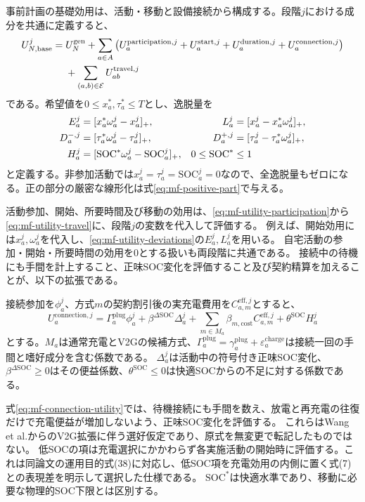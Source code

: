 事前計画の基礎効用は、活動・移動と設備接続から構成する。段階$j$における成分を共通に定義すると、
\begin{align}
 U_{N,\mathrm{base}}^j
 ={}&U_N^{\mathrm{gen}}
 +\sum_{a\in A}\left(
 U_a^{\mathrm{participation},j}+U_a^{\mathrm{start},j}
 +U_a^{\mathrm{duration},j}+U_a^{\mathrm{connection},j}\right)\notag\\
 &+\sum_{(a,b)\in\mathcal E}U_{ab}^{\mathrm{travel},j}
 \label{eq:mf-base-utility}
\end{align}
である。希望値を$0\le x_a^*,\tau_a^*\le T$とし、逸脱量を
\begin{align}
 E_a^j&=[x_a^*\omega_a^j-x_a^j]_+,&
 L_a^j&=[x_a^j-x_a^*\omega_a^j]_+,\notag\\
 D_a^{-,j}&=[\tau_a^*\omega_a^j-\tau_a^j]_+,&
 D_a^{+,j}&=[\tau_a^j-\tau_a^*\omega_a^j]_+,\notag\\
 H_a^j&=[\mathrm{SOC}^*\omega_a^j-\mathrm{SOC}_a^j]_+,
 &0\le\mathrm{SOC}^*&\le1
 \label{eq:mf-utility-deviations}
\end{align}
と定義する。非参加活動では$x_a^j=\tau_a^j=\mathrm{SOC}_a^j=0$なので、全逸脱量もゼロになる。正の部分の厳密な線形化は式\eqref{eq:mf-positive-part}で与える。

活動参加、開始、所要時間及び移動の効用は、\eqref{eq:mf-utility-participation}から\eqref{eq:mf-utility-travel}に、段階$j$の変数を代入して評価する。
例えば、開始効用には$x_a^j,\omega_a^j$を代入し、\eqref{eq:mf-utility-deviations}の$E_a^j,L_a^j$を用いる。
自宅活動の参加・開始・所要時間の効用を0とする扱いも両段階に共通である。
接続中の待機にも手間を計上すること、正味SOC変化を評価すること及び契約精算を加えることが、以下の拡張である。

接続参加を$\phi_a^j$、方式$m$の契約割引後の実充電費用を$C_{a,m}^{\mathrm{eff},j}$とすると、
\begin{equation}
 U_a^{\mathrm{connection},j}
 =\Gamma_a^{\mathrm{plug}}\phi_a^j
  +\beta^{\Delta\mathrm{SOC}}\Delta_a^j
  +\sum_{m\in M_a}\beta_{m,\mathrm{cost}}C_{a,m}^{\mathrm{eff},j}
  +\theta^{\mathrm{SOC}}H_a^j
 \label{eq:mf-connection-utility}
\end{equation}
とする。$M_a$は通常充電とV2Gの候補方式、$\Gamma_a^{\mathrm{plug}}=\gamma_a^{\mathrm{plug}}+\varepsilon_a^{\mathrm{charge}}$は接続一回の手間と嗜好成分を含む係数である。
$\Delta_a^j$は活動中の符号付き正味SOC変化、$\beta^{\Delta\mathrm{SOC}}\ge0$はその便益係数、$\theta^{\mathrm{SOC}}\le0$は快適SOCからの不足に対する係数である。

式\eqref{eq:mf-connection-utility}では、待機接続にも手間を数え、放電と再充電の往復だけで充電便益が増加しないよう、正味SOC変化を評価する。
これらはWang et al.からのV2G拡張に伴う選好仮定であり、原式を無変更で転記したものではない。
低SOCの項は充電選択にかかわらず各実施活動の開始時に評価する。これは同論文の運用目的式(38)に対応し、低SOC項を充電効用の内側に置く式(7)との表現差を明示して選択した仕様である。
$\mathrm{SOC}^*$は快適水準であり、移動に必要な物理的SOC下限とは区別する。

